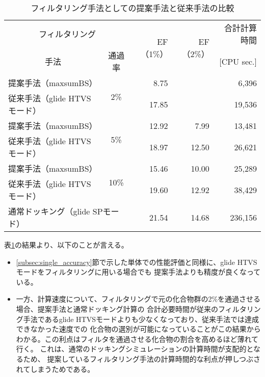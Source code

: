 \begin{table}[htb] \centering
	\caption{フィルタリング手法としての提案手法と従来手法の比較}
	\label{table:filtering_proposal_glide}
	\begin{tabular}{lc|rr|r}
	\hline
	\multicolumn{2}{c|}{フィルタリング}					&\multirow{2}{*}{EF（1\%）}	&\multirow{2}{*}{EF（2\%）}	&合計計算時間	\\
	\multicolumn{1}{c}{手法}		&通過率				&						&						&[CPU sec.]		\\ \hline
	提案手法（maxsumBS）		&\multirow{2}{*}{2\%}	&8.75					&\textendash				&6,396			\\
	従来手法（glide HTVSモード）	&					&17.85					&\textendash				&19,536			\\
	提案手法（maxsumBS）		&\multirow{2}{*}{5\%}	&12.92					&7.99					&13,481			\\
	従来手法（glide HTVSモード）	&					&18.97					&12.50					&26,621			\\
	提案手法（maxsumBS）		&\multirow{2}{*}{10\%}	&15.46					&10.00					&25,289			\\
	従来手法（glide HTVSモード）	&					&19.60					&12.92					&38,429			\\ \hline
	\multicolumn{2}{l|}{通常ドッキング（glide SPモード）}	&21.54					&14.68					&236,156			\\ \hline
	\end{tabular}
\end{table}

表\ref{table:filtering_proposal_glide}の結果より、以下のことが言える。
\begin{itemize}
\item \ref{subsec:single_accuracy}節で示した単体での性能評価と同様に、glide HTVSモードをフィルタリングに用いる場合でも
	提案手法よりも精度が良くなっている。
\item 一方、計算速度について、フィルタリングで元の化合物群の2\%を通過させる場合、提案手法と通常ドッキング計算の
	合計必要時間が従来のフィルタリング手法であるglide HTVSモードよりも少なくなっており、従来手法では達成できなかった速度での
	化合物の選別が可能になっていることがこの結果からわかる。この利点はフィルタを通過させる化合物の割合を高めるほど薄れて行く。
	これは、通常のドッキングシミュレーションの計算時間が支配的となるため、
	提案しているフィルタリング手法の計算時間的な利点が押しつぶされてしまうためである。
\end{itemize}